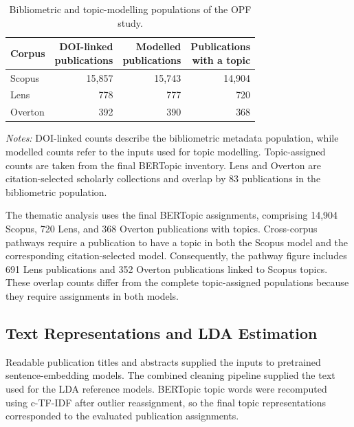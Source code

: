 \documentclass[a4paper,fleqn]{cas-sc}
\begin{document}
\begin{table}[htbp]
\centering
\caption{Bibliometric and topic-modelling populations of the OPF study.}
\label{tab:opf_corpus_populations}
\small
\setlength{\tabcolsep}{6pt}
\renewcommand{\arraystretch}{1.15}
\begin{tabular}{lrrr}
\toprule
Corpus
& \shortstack{DOI-linked\\publications}
& \shortstack{Modelled\\publications}
& \shortstack{Publications\\with a topic} \\
\midrule
Scopus  & 15,857 & 15,743 & 14,904 \\
Lens    & 778    & 777    & 720 \\
Overton & 392    & 390    & 368 \\
\bottomrule
\end{tabular}
\vspace{2mm}
\begin{minipage}{\textwidth}
\footnotesize
\textit{Notes:} DOI-linked counts describe the bibliometric metadata population, while modelled counts refer to the inputs used for topic modelling. Topic-assigned counts are taken from the final BERTopic inventory. Lens and Overton are citation-selected scholarly collections and overlap by 83 publications in the bibliometric population.
\end{minipage}
\end{table}

The thematic analysis uses the final BERTopic assignments, comprising 14,904 Scopus, 720 Lens, and 368 Overton publications with topics. Cross-corpus pathways require a publication to have a topic in both the Scopus model and the corresponding citation-selected model. Consequently, the pathway figure includes 691 Lens publications and 352 Overton publications linked to Scopus topics. These overlap counts differ from the complete topic-assigned populations because they require assignments in both models.

\subsection{Text Representations and LDA Estimation}\label{sec:text_preprocessing}

Readable publication titles and abstracts supplied the inputs to pretrained sentence-embedding models. The combined cleaning pipeline supplied the text used for the LDA reference models. BERTopic topic words were recomputed using c-TF-IDF after outlier reassignment, so the final topic representations corresponded to the evaluated publication assignments.
\end{document}

